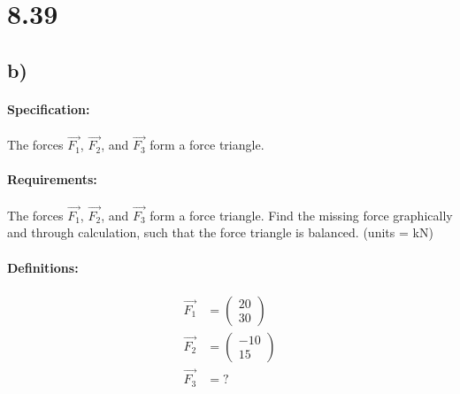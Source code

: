 \section{8.39}
\subsection{b)}

\paragraph{Specification:}
The forces $\vec{F_1}$, $\vec{F_2}$, and $\vec{F_3}$ form a force triangle. 

\paragraph{Requirements:}
The forces $\vec{F_1}$, $\vec{F_2}$, and $\vec{F_3}$ form a force triangle. 
Find the missing force graphically and through calculation, such that the force triangle 
is balanced. (units = kN)

\def\vFOne{\begin{pmatrix}
    20 \\ 
    30
\end{pmatrix}}
\def\vFTwo{\begin{pmatrix}
    -10 \\
    15
\end{pmatrix}}
\def\vFOnePTwo{\begin{pmatrix}
   10 \\ 
   45
\end{pmatrix}}

\def\vFThree{\begin{pmatrix}
   -10 \\ 
   -45
\end{pmatrix}}

\paragraph{Definitions:}
\begin{align}
   \vec{F_1} &= \vFOne \\ 
   \vec{F_2} &= \vFTwo \\ 
   \vec{F_3} &= ?
\end{align}

